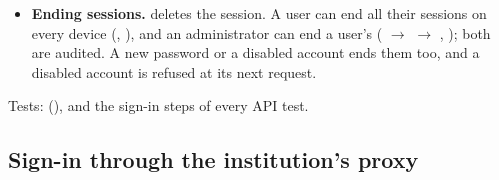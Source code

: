 \begin{itemize}
  ,  and , and  when
  , which is required behind TLS. Sessions expire after
   (default 12) and end when unused for 
  (default 60; with 0, only  ends them). The page's automatic checks for new
  data (, and requests marked ) do not count as use, so
  an unattended page signs out. The time of last use is written at most once a minute, and
  expired sessions are purged.
\item \textbf{Ending sessions.}  deletes the session. A user can end all their
  sessions on every device (, ), and an administrator can end a user's ( $\rightarrow$ 
  $\rightarrow$ , ); both are
  audited. A new password or a disabled account ends them too, and a disabled account is refused
  at its next request.
\end{itemize}
Tests:  (), and the sign-in steps of every
API test.

\subsection{Sign-in through the institution's proxy}
\label{sec:security-proxy}


